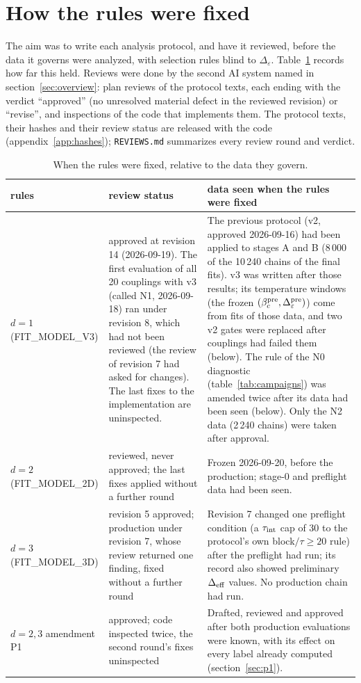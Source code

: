 \documentclass[10pt,a4paper]{article}
\newcommand{\De}{\Delta_\varepsilon}
\newcommand{\Deff}{\Delta_{\rm eff}}
\newcommand{\code}[1]{\texttt{#1}}
\begin{document}
\section{How the rules were fixed}\label{sec:rules}
The aim was to write each analysis protocol, and have it reviewed, before the data it governs were analyzed, with selection rules blind to
$\De$. Table~\ref{tab:timeline} records how far this held. Reviews were done by the second AI system named in section~\ref{sec:overview}:
plan reviews of the protocol texts, each ending with the verdict ``approved'' (no unresolved material defect in the reviewed revision) or
``revise'', and inspections of the code that implements them. The protocol texts, their hashes and their review status
are released with the code (appendix~\ref{app:hashes}); \code{REVIEWS.md} summarizes every review round and verdict.
\begin{table}[htbp]\centering\small
\caption{When the rules were fixed, relative to the data they govern.}\label{tab:timeline}
\begin{tabular}{@{}>{\raggedright\arraybackslash}p{2.9cm}>{\raggedright\arraybackslash}p{5.6cm}>{\raggedright\arraybackslash}p{6.6cm}@{}}\toprule
rules & review status & data seen when the rules were fixed \\\midrule
$d=1$ (FIT\_MODEL\_V3) & approved at revision 14 (2026-09-19). The first evaluation of all 20 couplings with v3 (called N1, 2026-09-18) ran under revision 8, which had not been reviewed (the review of revision 7 had asked for changes). The last fixes to the implementation are uninspected. & The previous protocol (v2, approved 2026-09-16) had been applied to stages A and B (8\,000 of the 10\,240 chains of the final fits). v3 was written after those results; its temperature windows (the frozen $(\beta_c^{\rm pre},\De^{\rm pre})$) come from fits of those data, and two v2 gates were replaced after couplings had failed them (below). The rule of the N0 diagnostic (table~\ref{tab:campaigns}) was amended twice after its data had been seen (below). Only the N2 data (2\,240 chains) were taken after approval. \\
$d=2$ (FIT\_MODEL\_2D) & reviewed, never approved; the last fixes applied without a further round & Frozen 2026-09-20, before the production; stage-0 and preflight data had been seen. \\
$d=3$ (FIT\_MODEL\_3D) & revision 5 approved; production under revision 7, whose review returned one finding, fixed without a further round & Revision 7 changed one preflight condition (a $\tau_{\rm int}$ cap of 30 to the protocol's own block$/\tau\ge20$ rule) after the preflight had run; its record also showed preliminary $\Deff$ values. No production chain had run. \\
$d=2,3$ amendment P1 & approved; code inspected twice, the second round's fixes uninspected & Drafted, reviewed and approved after both production evaluations were known, with its effect on every label already computed (section~\ref{sec:p1}). \\\bottomrule
\end{tabular}
\end{table}
\end{document}
